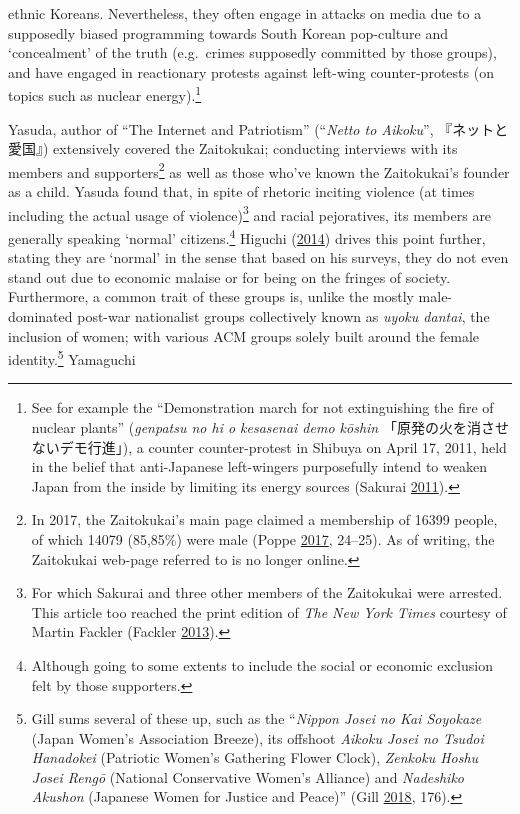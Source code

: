 \documentclass[10pt,british,A4paper,,openany]{memoir}
\begin{document}
ethnic Koreans. Nevertheless, they often engage in attacks on media due
to a supposedly biased programming towards South Korean pop-culture and
`concealment' of the truth (e.g.~crimes supposedly committed by those
groups), and have engaged in reactionary protests against left-wing
counter-protests (on topics such as nuclear energy).\footnote{See for
  example the ``Demonstration march for not extinguishing the fire of
  nuclear plants'' (\emph{genpatsu no hi o kesasenai demo kōshin}
  「原発の火を消させないデモ行進」), a counter counter-protest in
  Shibuya on April 17, 2011, held in the belief that anti-Japanese
  left-wingers purposefully intend to weaken Japan from the inside by
  limiting its energy sources (Sakurai
  \protect\hyperlink{ref-sakurai__2011}{2011}).}

Yasuda, author of ``The Internet and Patriotism'' (``\emph{Netto to
Aikoku}'', 『ネットと愛国』) extensively covered the Zaitokukai;
conducting interviews with its members and supporters\footnote{In 2017,
  the Zaitokukai's main page claimed a membership of 16399 people, of
  which 14079 (85,85\%) were male (Poppe
  \protect\hyperlink{ref-poppe_digitaal_2017}{2017}, 24--25). As of
  writing, the Zaitokukai web-page referred to is no longer online.} as
well as those who've known the Zaitokukai's founder as a child. Yasuda
found that, in spite of rhetoric inciting violence (at times including
the actual usage of violence)\footnote{For which Sakurai and three other
  members of the Zaitokukai were arrested. This article too reached the
  print edition of \emph{The New York Times} courtesy of Martin Fackler
  (Fackler \protect\hyperlink{ref-fackler_japanese_2013}{2013}).} and
racial pejoratives, its members are generally speaking `normal'
citizens.\footnote{Although going to some extents to include the social
  or economic exclusion felt by those supporters.} Higuchi
(\protect\hyperlink{ref-higuchi_japans_2014}{2014}) drives this point
further, stating they are `normal' in the sense that based on his
surveys, they do not even stand out due to economic malaise or for being
on the fringes of society. Furthermore, a common trait of these groups
is, unlike the mostly male-dominated post-war nationalist groups
collectively known as \emph{uyoku dantai}, the inclusion of women; with
various ACM groups solely built around the female identity.\footnote{Gill
  sums several of these up, such as the ``\emph{Nippon Josei no Kai
  Soyokaze} (Japan Women's Association Breeze), its offshoot
  \emph{Aikoku Josei no Tsudoi Hanadokei} (Patriotic Women's Gathering
  Flower Clock), \emph{Zenkoku Hoshu Josei Rengō} (National Conservative
  Women's Alliance) and \emph{Nadeshiko Akushon} (Japanese Women for
  Justice and Peace)'' (Gill
  \protect\hyperlink{ref-gill_nativist_2018}{2018}, 176).} Yamaguchi
\end{document}
